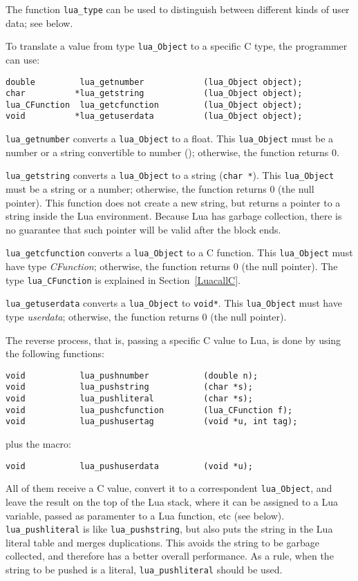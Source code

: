 The function \verb'lua_type' can be used to distinguish between
different kinds of user data; see below.

To translate a value from type \verb'lua_Object' to a specific C type,
the programmer can use:
\begin{verbatim}
double         lua_getnumber            (lua_Object object);
char          *lua_getstring            (lua_Object object);
lua_CFunction  lua_getcfunction         (lua_Object object);
void          *lua_getuserdata          (lua_Object object);
\end{verbatim}
\verb'lua_getnumber' converts a \verb'lua_Object' to a float.
This \verb'lua_Object' must be a number or a string convertible to number
(); otherwise, the function returns 0.

\verb'lua_getstring' converts a \verb'lua_Object' to a string (\verb'char *').
This \verb'lua_Object' must be a string or a number;
otherwise, the function returns 0 (the null pointer).
This function does not create a new string, but returns a pointer to
a string inside the Lua environment.
Because Lua has garbage collection, there is no guarantee that such
pointer will be valid after the block ends.

\verb'lua_getcfunction' converts a \verb'lua_Object' to a C function.
This \verb'lua_Object' must have type {\em CFunction\/};
otherwise, the function returns 0 (the null pointer).
The type \verb'lua_CFunction' is explained in Section~\ref{LuacallC}.

\verb'lua_getuserdata' converts a \verb'lua_Object' to \verb'void*'.
This \verb'lua_Object' must have type {\em userdata\/};
otherwise, the function returns 0 (the null pointer).

The reverse process, that is, passing a specific C value to Lua,
is done by using the following functions:
\begin{verbatim}
void           lua_pushnumber           (double n);
void           lua_pushstring           (char *s);
void           lua_pushliteral          (char *s);
void           lua_pushcfunction        (lua_CFunction f);
void           lua_pushusertag          (void *u, int tag);
\end{verbatim}
plus the macro:
\begin{verbatim}
void           lua_pushuserdata         (void *u);
\end{verbatim}
All of them receive a C value,
convert it to a correspondent \verb'lua_Object',
and leave the result on the top of the Lua stack,
where it can be assigned to a Lua variable,
passed as paramenter to a Lua function, etc (see below). \label{pushing}
\verb'lua_pushliteral' is like \verb'lua_pushstring',
but also puts the string in the Lua literal table and merges duplications.
This avoids the string to be garbage collected,
and therefore has a better overall performance.
As a rule, when the string to be pushed is a literal,
\verb'lua_pushliteral' should be used.

